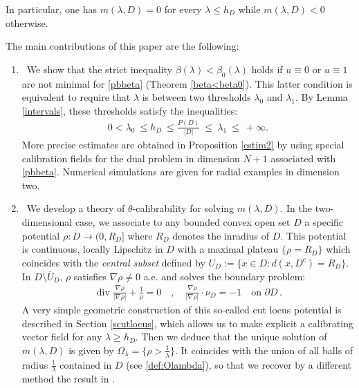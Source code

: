 \documentclass[reqno,11pt]{amsart}
\theoremstyle{definition}
\numberwithin{equation}{section}
\def\ov{\overline}
\DeclareMathOperator{\Div}{div}
\renewcommand{\div}{\Div}
\newcommand{\1}{{{\bf 1}\kern-0,28em\rm l}}
\def\l{\lambda}
\begin{document}
In particular, one has  $m(\lambda, D) =0$ for every $\l \le h_D$ while $m(\l,D)<0$ otherwise. 

\bigskip
The  main contributions of this paper are the following:

\begin{enumerate}[leftmargin=4mm]
\item [-] \ We show that the strict inequality $\beta(\lambda) <\beta_0(\lambda)$ holds if
 $u\equiv 0$ or $u\equiv 1$ are not  minimal for \eqref{pbbeta} (Theorem \ref{beta<beta0}). This latter condition is equivalent to require that $\lambda$ is between  two thresholds $\l_0$ and $\l_1$.
 By Lemma \ref{intervals},  these thresholds satisfy the inequalities:
  \begin{align*}
0< \lambda_0\ \le h_D\ \le \frac{P(D)}{|D|}\ \le\ \lambda_1 \ \le \ +\infty .
\end{align*}
More precise estimates are obtained in Proposition \ref{estim2} by using special calibration fields for the dual problem in dimension $N+1$ associated with
\eqref{pbbeta}. Numerical simulations are given  for radial examples in dimension two. 

\item[-] \ We develop a theory of $\theta$-calibrability for solving $m(\lambda, D)$. In the two-dimensional case,  we associate to any bounded  convex  open set $D$  a specific potential  $\rho:\ov D\to (0, R_D]$  where $R_D$ denotes the inradius of $D$. This potential is  continuous, locally Lipschitz in $D$ with  a maximal plateau $\{\rho=R_D\}$ which coincides with the \emph{central subset}  defined by $U_D:= \{x\in D : d(x,D^c)=R_D\}$.  
In  $D\setminus \ov U_D$, $\rho$ satisfies  $\nabla \rho\not=0$ a.e. and solves the  boundary problem:
\begin{align}\label{masterpde} \div \frac{\nabla \rho}{|\nabla \rho|} +  \frac1{\rho} =0 \quad, \quad \frac{\nabla \rho}{|\nabla \rho|}\cdot \nu_D=- 1 \quad \text{on $\partial D$}\, . \end{align}
 A very simple geometric construction of this so-called cut locus potential is described in 
Section \ref{scutlocus}, which allows us to make explicit a calibrating vector field for any $\l\ge h_D$. Then we deduce that the unique solution  of $m(\lambda,D)$  is given by $\Omega_\l = \{\rho> \frac1{\l}\}$. It  coincides with the union of all balls of radius $\frac1{\l}$ contained in $D$ (see \eqref{def:Olambda}),
so that we recover by a different  method the result in \cite{alter2009uniqueness,alter2005characterization}. 
\end{enumerate}
\end{document}
